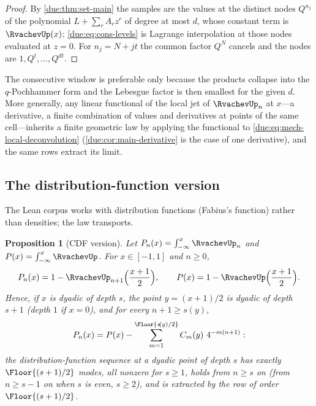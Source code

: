 \documentclass[11pt,oneside]{article}
\theoremstyle{plain}
\newtheorem{proposition}[theorem]{Proposition}
\theoremstyle{definition}
\theoremstyle{remark}
\newcommand{\upn}[1]{\RvachevUp_{#1}}
\newcommand{\dep}[1]{s\!\left(#1\right)}                    %
\newcommand{\Qq}{Q}                                         %
\newcommand{\Cr}[2]{C_{#1}\!\left(#2\right)}                %
\begin{document}
\begin{proof}
By \cref{due:thm:set-main} the samples are the values at the distinct nodes
$\Qq^{n_{j}}$ of the polynomial $L+\sum_{r}A_{r}z^{r}$ of degree at most
$d$, whose constant term is $\RvachevUp(x)$; \cref{due:eq:cons-levels} is
Lagrange interpolation at those nodes evaluated at $z=0$.  For
$n_{j}=N+jt$ the common factor $\Qq^{N}$ cancels and the nodes are
$1,\Qq^{t},\ldots,\Qq^{dt}$.
\end{proof}

The consecutive window is preferable only because the products collapse
into the $q$-Pochhammer form and the Lebesgue factor is then smallest for
the given $d$.  More generally, any linear functional of the local jet of
$\upn{n}$ at $x$---a derivative, a finite combination of values and
derivatives at points of the same cell---inherits a finite geometric law
by applying the functional to \cref{due:eq:mech-local-deconvolution}
(\cref{due:cor:main-derivative} is the case of one derivative), and the
same rows extract its limit.

\subsection{The distribution-function version}
\label{due:sec:cons-cdf}

The Lean corpus works with distribution functions (Fabius's function) rather
than densities; the law transports.

\begin{proposition}[CDF version]
\label{due:prop:cons-cdf}
Let $P_{n}(x)=\int_{-\infty}^{x}\upn{n}$ and $P(x)=\int_{-\infty}^{x}\RvachevUp$.
For $x\in[-1,1]$ and $n\ge0$,
\begin{equation}
 P_{n}(x)=1-\upn{n+1}\Bigl(\frac{x+1}{2}\Bigr),
 \qquad
 P(x)=1-\RvachevUp\Bigl(\frac{x+1}{2}\Bigr).
 \label{due:eq:cons-cdf-transport}
\end{equation}
Hence, if $x$ is dyadic of depth $s$, the point $y=(x+1)/2$ is dyadic of
depth $s+1$ (depth $1$ if $x=0$), and for every $n+1\ge\dep{y}$,
\begin{equation}
 P_{n}(x)=P(x)-\sum_{m=1}^{\Floor{\dep{y}/2}}\Cr{m}{y}\,4^{-m(n+1)}:
 \label{due:eq:cons-cdf-law}
\end{equation}
the distribution-function sequence at a dyadic point of depth $s$ has
exactly $\Floor{(s+1)/2}$ modes, all nonzero for $s\ge1$, holds from
$n\ge s$ on (from $n\ge s-1$ on when $s$ is even, $s\ge2$), and is
extracted by the row of order $\Floor{(s+1)/2}$.
\end{proposition}
\end{document}
